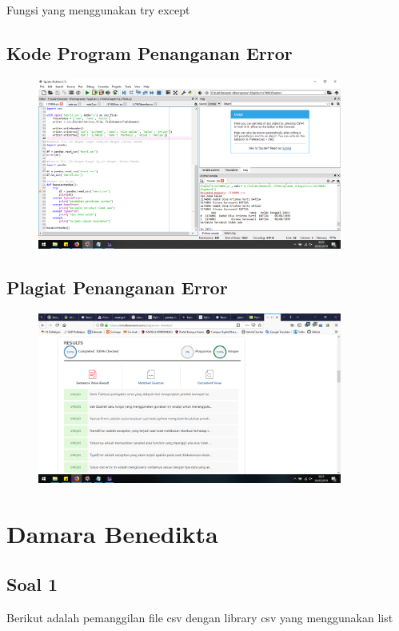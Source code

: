 Fungsi yang menggunakan try except


\subsection{Kode Program Penanganan Error}
\begin{figure}[H]
	\includegraphics[width=10cm]{figures/4/1174006/Praktek/p1.png}
	\centering
\end{figure}

\subsection{Plagiat Penanganan Error}
\begin{figure}[H]
	\includegraphics[width=10cm]{figures/4/1174006/Praktek/plagiatpenanganan.png}
	\centering
\end{figure}


\section{Damara Benedikta}
\subsection{Soal 1}
Berikut adalah pemanggilan file csv dengan library csv yang menggunakan list


